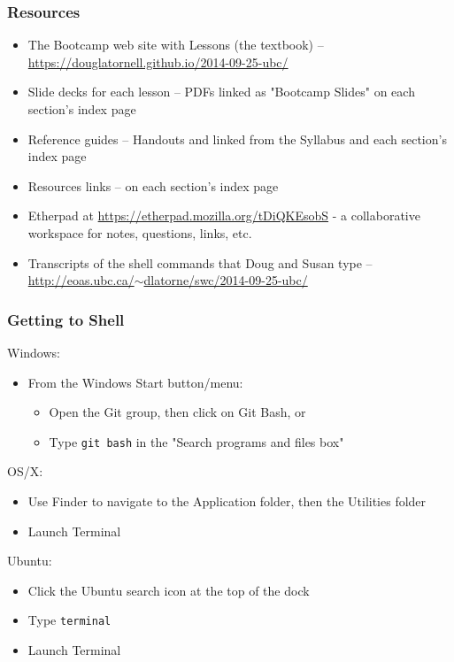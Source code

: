 \documentclass[xcolor=dvipsnames]{beamer}
\begin{document}
\begin{frame}
\frametitle{Resources}
\begin{itemize}
\item The Bootcamp web site with Lessons (the textbook) -- \href{https://douglatornell.github.io/2014-09-25-ubc/}{https://douglatornell.github.io/2014-09-25-ubc/}
\item Slide decks for each lesson -- PDFs linked as "Bootcamp Slides" on each section's index page
\item Reference guides -- Handouts and linked from the Syllabus and each section's index page
\item Resources links -- on each section's index page
\item Etherpad at \href{https://etherpad.mozilla.org/tDiQKEsobS}{https://etherpad.mozilla.org/tDiQKEsobS} - a collaborative workspace for notes, questions, links, etc.
\item Transcripts of the shell commands that Doug and Susan type -- \href{http://eoas.ubc.ca/~dlatorne/swc/2014-09-25-ubc/}{http://eoas.ubc.ca/$\sim$dlatorne/swc/2014-09-25-ubc/}
\end{itemize}
\end{frame}

\begin{frame}
\frametitle{Getting to Shell}
Windows:
\begin{itemize}
    \item From the Windows Start button/menu:
    \begin{itemize}
        \item Open the Git group, then click on Git Bash, or
        \item Type {\tt git bash} in the "Search programs and files box"
    \end{itemize}
\end{itemize}

OS/X:
\begin{itemize}
    \item Use Finder to navigate to the Application folder, then the Utilities folder
    \item Launch Terminal
\end{itemize}

Ubuntu:
\begin{itemize}
    \item Click the Ubuntu search icon at the top of the dock
    \item Type {\tt terminal}
    \item Launch Terminal
\end{itemize}

\end{frame}
\end{document}
